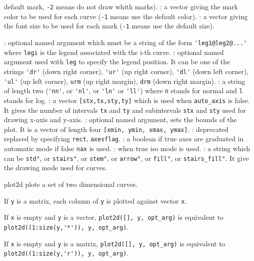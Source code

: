 \begin{parameters}
\begin{varlist}
\begin{varlist}
    default mark, \verb!-2! means do not draw whith marks).
    :  a vector giving the mark color to be used for each curve (\verb!-1! means use the
    default  color).
    : a vector giving the font size to be used for each mark (\verb!-1! means use the
    default size).
    \end{varlist}
    : optional named argument which must be a string of the form
    \verb!'leg1@leg2@...'! where \verb!legi! is the legend associated with the i-th curve.
    : optional named argument used with \verb!leg! to specify the legend position.
    It can be one of the strings \verb!'dr'! (down right corner), \verb!'ur'! (up right corner), \verb!'dl'! (down left corner), \verb!'ul'!  (up left corner),
    \verb!urm! (up right margin), \verb!drm! (down right margin).
    : a string of length two (\verb!'nn'!, or \verb!'nl'!, or \verb!'ln'! or
    \verb!'ll'!) where \verb!n! stands for normal and \verb!l! stands for log.
    : a vector \verb![stx,tx,sty,ty]! which is used when
    \verb!auto_axis! is false. It gives the number of intervals \verb!tx! and
    \verb!ty! and subintervals \verb!stx! and \verb!sty! used for drawing x-axis
    and y-axis.
    : optional named argument, sets the bounds of the plot. It is a vector of length four
    \verb+[xmin, ymin, xmax, ymax]+.
    : deprecated replaced by specifying \verb!rect!, \verb!axesflag!.
    : a boolean if true axes are graduated in automatic mode if
    false \verb!nax! is used.
    : when true iso mode is used.
    : a string which can be \verb!std"!, or \verb!stairs"!, or \verb!stem"!,
    or \verb!arrow"!, or \verb!fill"!, or \verb!stairs_fill"!. It give the drawing mode
    used for curves.
  \end{varlist}
\end{parameters}

\begin{mandescription}
  plot2d plots a set of two dimensional curves.

  If \verb+y+ is a matrix, each column of \verb+y+ is plotted against vector
  \verb+x+.

  If \verb+x+ is empty and \verb+y+ is a vector, \verb+plot2d([], y, opt_arg)+ is
  equivalent to \verb|plot2d((1:size(y,'*')), y, opt_arg)|.

  If \verb+x+ is empty and \verb+y+ is a matrix, \verb+plot2d([], y, opt_arg)+ is
  equivalent to \verb|plot2d((1:size(y,'r')), y, opt_arg)|.
\end{mandescription}

